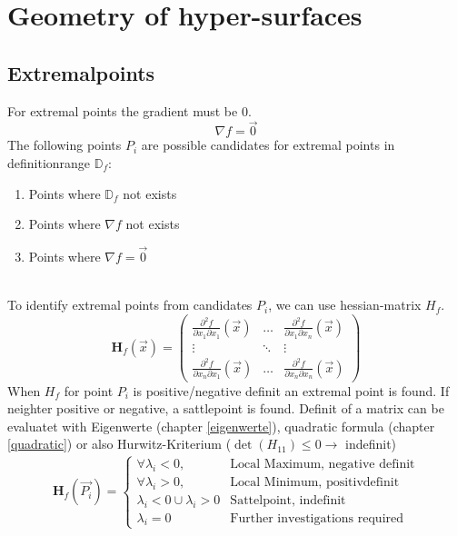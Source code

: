 \section{Geometry of hyper-surfaces}
\subsection{Extremalpoints}
For extremal points the gradient must be $0$.
\[\nabla f = \vec{0}\]
The following points $P_i$ are possible candidates for extremal points in definitionrange $\mathbb{D}_f$:
\begin{enumerate}[nosep]
	\item Points where $\mathbb{D}_f$ not exists
	\item Points where $\nabla f$ not exists
	\item Points where $\nabla f = \vec{0}$
\end{enumerate}

~\\
\noindent To identify extremal points from candidates $P_i$, we can use hessian-matrix $H_f$.
\[
\mathbf{H}_f(\vec{x}) = \begin{pmatrix}
	\frac{\partial^2 f}{\partial x_1 \partial x_1}(\vec{x}) & \dots & \frac{\partial^2 f}{\partial x_1 \partial x_n}(\vec{x})\\
	\vdots & \ddots & \vdots \\
	\frac{\partial^2 f}{\partial x_n \partial x_1}(\vec{x}) & \dots & \frac{\partial^2 f}{\partial x_n \partial x_n}(\vec{x})
\end{pmatrix}
\]
When $H_f$ for point $P_i$ is positive/negative definit an extremal point is found. If neighter positive or negative, a sattlepoint is found. Definit of a matrix can be evaluatet with Eigenwerte (chapter \ref{eigenwerte}), quadratic formula (chapter \ref{quadratic}) or also Hurwitz-Kriterium ($\det(H_{11}) \le 0 \rightarrow$ indefinit)
\begin{align*}
	\mathbf{H}_f(\vec{P_i}) = \begin{cases*}
		\forall \lambda_i < 0, & \text{Local Maximum, negative definit} \\
		\forall \lambda_i > 0, & \text{Local Minimum, positivdefinit} \\
		\lambda_i < 0 \cup \lambda_i > 0 & \text{Sattelpoint, indefinit} \\
		\lambda_i = 0 & \text{Further investigations required}
	\end{cases*}
\end{align*}


